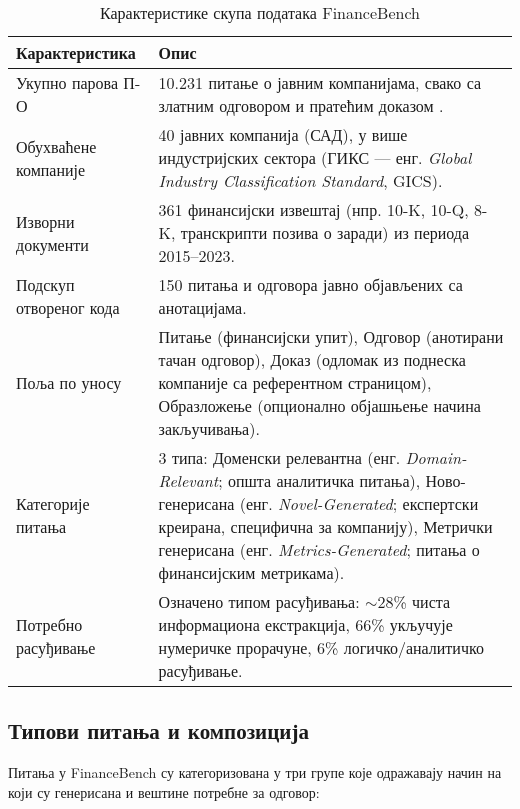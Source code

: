 \begin{table}[h]
\centering
\begin{tabular}{|p{4cm}|p{10cm}|}
\hline
\textbf{Карактеристика} & \textbf{Опис} \\
\hline
Укупно парова П-О & 10.231 питање о јавним компанијама, свако са златним одговором и пратећим доказом \cite{islam_financebench_2023}. \\
\hline
Обухваћене компаније & 40 јавних компанија (САД), у више индустријских сектора (ГИКС — енг. \textit{Global Industry Classification Standard}, GICS). \\
\hline
Изворни документи & 361 финансијски извештај (нпр. 10-K, 10-Q, 8-K, транскрипти позива о заради) из периода 2015–2023. \\
\hline
Подскуп отвореног кода & 150 питања и одговора јавно објављених са анотацијама. \\
\hline
Поља по уносу & Питање (финансијски упит), Одговор (анотирани тачан одговор), Доказ (одломак из поднеска компаније са референтном страницом), Образложење (опционално објашњење начина закључивања). \\
\hline
Категорије питања & 3 типа: Доменски релевантна (енг. \textit{Domain-Relevant}; општа аналитичка питања), Ново-генерисана (енг. \textit{Novel-Generated}; експертски креирана, специфична за компанију), Метрички генерисана (енг. \textit{Metrics-Generated}; питања о финансијским метрикама). \\
\hline
Потребно расуђивање & Означено типом расуђивања: $\sim$28\% чиста информациона екстракција, 66\% укључује нумеричке прорачуне, 6\% логичко/аналитичко расуђивање. \\
\hline
\end{tabular}
\caption{Карактеристике скупа података FinanceBench}
\label{tab:financebench}
\end{table}

\subsection{Типови питања и композиција}

Питања у FinanceBench су категоризована у три групе које одражавају начин на који су генерисана и вештине потребне за одговор:

